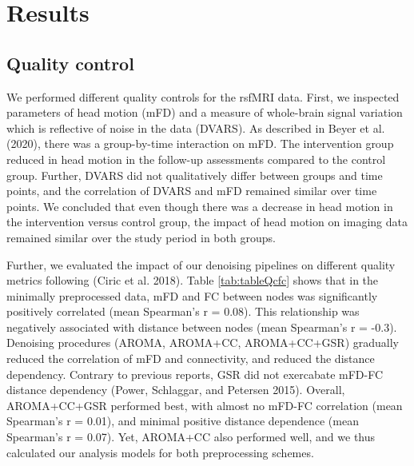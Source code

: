 \documentclass[
]{article}
\begin{document}
\newpage

\hypertarget{results}{%
\section{Results}\label{results}}

\hypertarget{quality-control}{%
\subsection{Quality control}\label{quality-control}}

We performed different quality controls for the rsfMRI data.
First, we inspected parameters of head motion (mFD) and a measure of whole-brain signal variation which is reflective of noise in the data (DVARS).
As described in Beyer et al. (2020), there was a group-by-time interaction on mFD. The intervention group reduced in head motion in the follow-up assessments compared to the control group.
Further, DVARS did not qualitatively differ between groups and time points, and the correlation of DVARS and mFD remained similar over time points.
We concluded that even though there was a decrease in head motion in the intervention versus control group, the impact of head motion on imaging data remained similar over the study period in both groups.

Further, we evaluated the impact of our denoising pipelines on different quality metrics following (Ciric et al. 2018). Table \ref{tab:tableQcfc} shows that in the minimally preprocessed data, mFD and FC between nodes was significantly positively correlated (mean Spearman's r = 0.08). This relationship was negatively associated with distance between nodes (mean Spearman's r = -0.3).\\
Denoising procedures (AROMA, AROMA+CC, AROMA+CC+GSR) gradually reduced the correlation of mFD and connectivity, and reduced the distance dependency. Contrary to previous reports, GSR did not exercabate mFD-FC distance dependency (Power, Schlaggar, and Petersen 2015). Overall, AROMA+CC+GSR performed best, with almost no mFD-FC correlation (mean Spearman's r = 0.01), and minimal positive distance dependence (mean Spearman's r = 0.07). Yet, AROMA+CC also performed well, and we thus calculated our analysis models for both preprocessing schemes.
\end{document}
